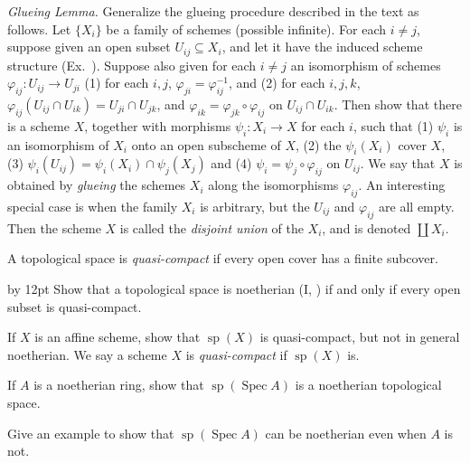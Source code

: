 {{\vspace{2pt}
\noindent\hypertarget{ex-II-2.12}{}\emph{Glueing Lemma.} Generalize the glueing procedure described in the text  as follows. Let $\{X_i\}$ be a family of schemes (possible infinite). For each $i\ne j$, suppose given an open subset $U_{ij}\subseteq X_i$, and let it have the induced scheme structure (Ex.~). Suppose also given for each $i\ne j$ an isomorphism of schemes $\varphi_{ij}\colon U_{ij}\to U_{ji}$  (1) for each $i,j$, $\varphi_{ji}=\varphi_{ij}^{-1}$, and (2) for each $i,j,k$, $\varphi_{ij}(U_{ij}\cap U_{ik})=U_{ji}\cap U_{jk}$, and $\varphi_{ik}=\varphi_{jk}\circ\varphi_{ij}$ on $U_{ij}\cap U_{ik}$. Then show that there is a scheme $X$, together with morphisms $\psi_i\colon X_i\to X$ for each $i$, such that (1) $\psi_i$ is an isomorphism of $X_i$ onto an open subscheme of $X$, (2) the $\psi_i(X_i)$ cover $X$, (3) $\psi_i(U_{ij})=\psi_i(X_i)\cap\psi_j(X_j)$ and (4) $\psi_i=\psi_j\circ\varphi_{ij}$ on $U_{ij}$. We say that $X$ is obtained by \emph{glueing} the schemes $X_i$ along the isomorphisms $\varphi_{ij}$. An interesting special case is when the family $X_i$ is arbitrary, but the $U_{ij}$ and $\varphi_{ij}$ are all empty. Then the scheme $X$ is called the \emph{disjoint union} of the $X_i$, and is denoted $\coprod X_i$.

\vspace{2pt}
\noindent\hypertarget{ex-II-2.13}{}A topological space is \emph{quasi-compact} if every open cover has a finite subcover.

{\advance\leftskip by 12pt
\noindent\hypertarget{ex-II-2.13a}{}Show that a topological space is noetherian (I, ) if and only if every open subset is quasi-compact.

\noindent\hypertarget{ex-II-2.13b}{}If $X$ is an affine scheme, show that $\operatorname{sp}(X)$ is quasi-compact, but not in general noetherian. We say a scheme $X$ is \emph{quasi-compact} if $\operatorname{sp}(X)$ is.

\noindent\hypertarget{ex-II-2.13c}{}If $A$ is a noetherian ring, show that $\operatorname{sp}(\operatorname{Spec}A)$ is a noetherian topological space.

\noindent\hypertarget{ex-II-2.13d}{}Give an example to show that $\operatorname{sp}(\operatorname{Spec}A)$ can be noetherian even when $A$ is not.\par}

}}
